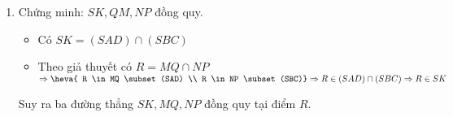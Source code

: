 \begin{vd}
{\begin{enumerate}
			\begin{itemize}
				\item Có $SE=(SAB) \cap (SCD)$
				\item Theo giả thuyết có $H=MN \cap PQ$\\
				$\Rightarrow\heva{H \in MN \subset(SAB) \\ H \in PQ \subset (SCD)}\\
				\Rightarrow H \in (SAB) \cap (SCD)\Rightarrow H \in SE$
			\end{itemize}
			Suy ra ba điểm điểm $S, H, E$ thẳng hàng.
			\item Chứng minh: $SK, QM, NP$ đồng quy.
			\begin{itemize}
				\item Có $SK = (SAD) \cap (SBC)$
				\item Theo giả thuyết có $ R = MQ \cap NP$\\
				$\Rightarrow \heva{ R \in MQ \subset(SAD) \\ R \in NP \subset(SBC)}\\
				\Rightarrow R \in(SAD) \cap (SBC) \Rightarrow R \in SK$ 
			\end{itemize}
			Suy ra ba đường thẳng $SK, MQ, NP$ đồng quy tại điểm $R$.
		\end{enumerate}
	}
\end{vd}
